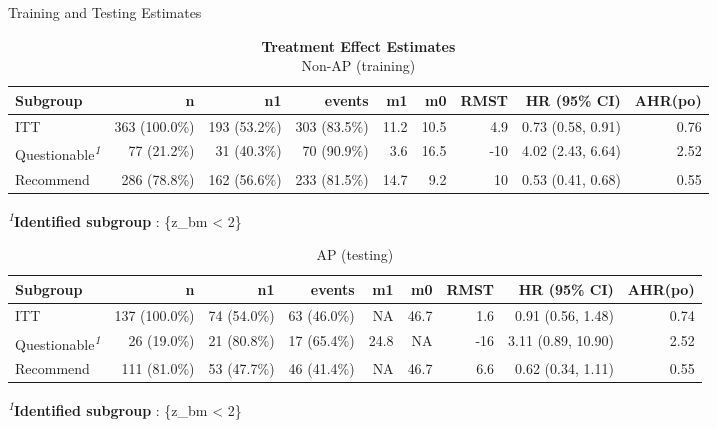 \documentclass[
  ignorenonframetext,
  aspectratio=169]{beamer}
\begin{document}
\begin{frame}{Training and Testing Estimates}
\label{training-and-testing-estimates}
\begin{table}[t]
\caption*{
{\fontsize{10}{13}\selectfont  \textbf{Treatment Effect Estimates}\fontsize{7}{8}\selectfont } \\ 
{\fontsize{9}{11}\selectfont  Non-AP (training)\fontsize{7}{8}\selectfont }
} 
\fontsize{7.0pt}{8.0pt}\selectfont
\begin{tabular*}{1\linewidth}{@{\extracolsep{\fill}}lrrrrrrrr}
\toprule
Subgroup & n & n1 & events & m1 & m0 & RMST & HR (95\% CI) & AHR(po) \\ 
\midrule\addlinespace[2.5pt]
ITT & 363 (100.0\%) & 193 (53.2\%) & 303 (83.5\%) & 11.2 & 10.5 & 4.9 & 0.73 (0.58, 0.91) & 0.76 \\ 
Questionable\textsuperscript{\textit{1}} & 77 (21.2\%) & 31 (40.3\%) & 70 (90.9\%) & 3.6 & 16.5 & -10 & 4.02 (2.43, 6.64) & 2.52 \\ 
Recommend & 286 (78.8\%) & 162 (56.6\%) & 233 (81.5\%) & 14.7 & 9.2 & 10 & 0.53 (0.41, 0.68) & 0.55 \\ 
\bottomrule
\end{tabular*}
\begin{minipage}{\linewidth}
\vspace{.05em}
\textsuperscript{\textit{1}}\textbf{Identified subgroup} : \{z\_bm \textless{} 2\}\\
\end{minipage}
\end{table}
\begin{table}[t]
\caption*{
{\fontsize{10}{13}\selectfont  AP (testing)\fontsize{7}{8}\selectfont }
} 
\fontsize{7.0pt}{8.0pt}\selectfont
\begin{tabular*}{1\linewidth}{@{\extracolsep{\fill}}lrrrrrrrr}
\toprule
Subgroup & n & n1 & events & m1 & m0 & RMST & HR (95\% CI) & AHR(po) \\ 
\midrule\addlinespace[2.5pt]
ITT & 137 (100.0\%) & 74 (54.0\%) & 63 (46.0\%) & NA & 46.7 & 1.6 & 0.91 (0.56, 1.48) & 0.74 \\ 
Questionable\textsuperscript{\textit{1}} & 26 (19.0\%) & 21 (80.8\%) & 17 (65.4\%) & 24.8 & NA & -16 & 3.11 (0.89, 10.90) & 2.52 \\ 
Recommend & 111 (81.0\%) & 53 (47.7\%) & 46 (41.4\%) & NA & 46.7 & 6.6 & 0.62 (0.34, 1.11) & 0.55 \\ 
\bottomrule
\end{tabular*}
\begin{minipage}{\linewidth}
\vspace{.05em}
\textsuperscript{\textit{1}}\textbf{Identified subgroup} : \{z\_bm \textless{} 2\}\\
\end{minipage}
\end{table}
\end{frame}
\end{document}
